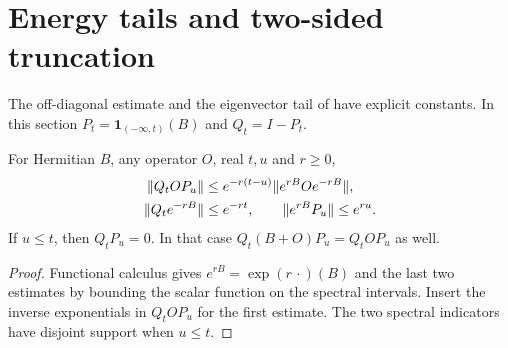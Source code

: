 \section{Energy tails and two-sided truncation}

The off-diagonal estimate and the eigenvector tail of
\cite[Lemmas~6.6--6.7]{Arad2013AreaLaw} have explicit constants.
In this section $P_t=\mathbf1_{(-\infty,t)}(B)$ and $Q_t=I-P_t$.

\begin{lemma}
    \label{lem:aklv_spectral_separation}
    \leanok
    For Hermitian $B$, any operator $O$, real $t,u$ and $r\ge0$,
    \begin{align}
        \|Q_tOP_u\|    & \le e^{-r(t-u)}\|e^{rB}Oe^{-rB}\|,\notag \\
        \|Q_te^{-rB}\| & \le e^{-rt},\qquad
        \|e^{rB}P_u\|\le e^{ru}.
    \end{align}
    If $u\le t$, then $Q_tP_u=0$.
    In that case $Q_t(B+O)P_u=Q_tOP_u$ as well.
\end{lemma}
\begin{proof}\leanok
    Functional calculus gives $e^{rB}=\exp(r\,\cdot)(B)$ and the last
    two estimates by bounding the scalar function on the spectral intervals.
    Insert the inverse exponentials in $Q_tOP_u$ for the first estimate.
    The two spectral indicators have disjoint support when $u\le t$.
\end{proof}

